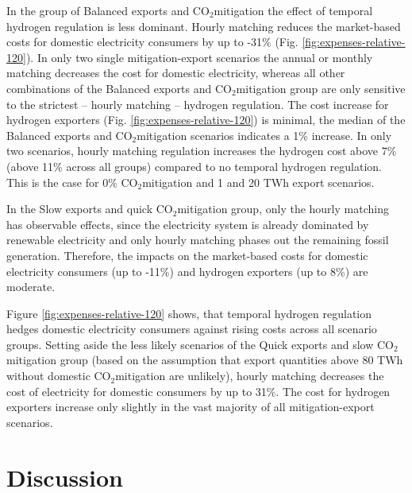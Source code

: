 \documentclass[5p,numafflabel]{elsarticle}
\newcommand{\co}{\ce{CO2}~}
\def\co{CO${}_2${\:}}
\begin{document}
In the group of Balanced exports and \co mitigation the effect of temporal hydrogen regulation is less dominant.
Hourly matching reduces the market-based costs for domestic electricity consumers by up to -31\% (Fig. \ref{fig:expenses-relative-120}). In only two single mitigation-export scenarios the annual or monthly matching decreases the cost for domestic electricity, whereas all other combinations of the Balanced exports and \co mitigation group are only sensitive to the strictest -- hourly matching -- hydrogen regulation. 
The cost increase for hydrogen exporters (Fig. \ref{fig:expenses-relative-120}) is minimal, the median of the Balanced exports and \co mitigation scenarios indicates a 1\% increase.
In only two scenarios, hourly matching regulation increases the hydrogen cost above 7\% (above 11\% across all groups) compared to no temporal hydrogen regulation. This is the case for 0\% \co mitigation and 1 and 20 TWh export scenarios. 

In the Slow exports and quick \co mitigation group, only the hourly matching has observable effects, since the electricity system is already dominated by renewable electricity and only hourly matching phases out the remaining fossil generation. Therefore, the impacts on the market-based costs for domestic electricity consumers (up to -11\%) and hydrogen exporters (up to 8\%) are moderate.

Figure \ref{fig:expenses-relative-120} shows, that temporal hydrogen regulation hedges domestic electricity consumers against rising costs across all scenario groups.
Setting aside the less likely scenarios of the Quick exports and slow \co mitigation group (based on the assumption that export quantities above 80 TWh without domestic \co mitigation are unlikely), hourly matching decreases the cost of electricity for domestic consumers by up to 31\%. The cost for hydrogen exporters increase only slightly in the vast majority of all mitigation-export scenarios.


\section*{Discussion}
\label{sec:discussion}
\end{document}
